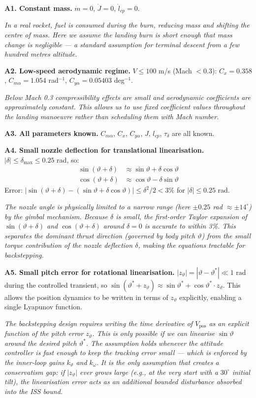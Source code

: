 \documentclass[11pt,a4paper]{article}
\theoremstyle{plain}
\theoremstyle{remark}
\newcommand{\vth}{\vartheta}
\newcommand{\vths}{\vartheta^*}
\newcommand{\zth}{z_{\vth}}
\newcommand{\dmax}{\delta_{\max}}
\begin{document}
\textbf{A1. Constant mass.} $\dot m = 0$, $\dot J = 0$, $\dot l_{cp} = 0$.

\textit{In a real rocket, fuel is consumed during the burn, reducing mass and shifting the centre of mass. Here we assume the landing burn is short enough that mass change is negligible --- a standard assumption for terminal descent from a few hundred metres altitude.}

\textbf{A2. Low-speed aerodynamic regime.} $V \leq 100$ m/s (Mach $< 0.3$): $C_x = 0.358$, $C_{m\alpha} = 1.054$ rad$^{-1}$, $C_{y\alpha} = 0.05403$ deg$^{-1}$.

\textit{Below Mach 0.3 compressibility effects are small and aerodynamic coefficients are approximately constant. This allows us to use fixed coefficient values throughout the landing manoeuvre rather than scheduling them with Mach number.}

\textbf{A3. All parameters known.} $C_{m\alpha}$, $C_x$, $C_{y\alpha}$, $J$, $l_{cp}$, $\tau_\delta$ are all known.

\textbf{A4. Small nozzle deflection for translational linearisation.} $|\delta| \leq \dmax \leq 0.25$ rad, so:
\begin{align}
  \sin(\vth + \delta) &\approx \sin\vth + \delta\cos\vth \\
  \cos(\vth + \delta) &\approx \cos\vth - \delta\sin\vth
\end{align}
Error: $|\sin(\vth+\delta) - (\sin\vth + \delta\cos\vth)| \leq \delta^2/2 < 3\%$ for $|\delta| \leq 0.25$ rad.

\textit{The nozzle angle is physically limited to a narrow range (here $\pm 0.25$ rad $\approx \pm 14^{\circ}$) by the gimbal mechanism. Because $\delta$ is small, the first-order Taylor expansion of $\sin(\vth+\delta)$ and $\cos(\vth+\delta)$ around $\delta=0$ is accurate to within 3\%. This separates the dominant thrust direction (governed by body pitch $\vth$) from the small torque contribution of the nozzle deflection $\delta$, making the equations tractable for backstepping.}

\textbf{A5. Small pitch error for rotational linearisation.} $|\zth| = |\vth - \vths| \ll 1$ rad during the controlled transient, so $\sin(\vths + \zth) \approx \sin\vths + \cos\vths\cdot \zth$. This allows the position dynamics to be written in terms of $\zth$ explicitly, enabling a single Lyapunov function.

\textit{The backstepping design requires writing the time derivative of $V_\mathrm{pos}$ as an explicit function of the pitch error $\zth$. This is only possible if we can linearise $\sin\vth$ around the desired pitch $\vths$. The assumption holds whenever the attitude controller is fast enough to keep the tracking error small --- which is enforced by the inner-loop gains $k_\vth$ and $k_\omega$. It is the only assumption that creates a conservatism gap: if $|\zth|$ ever grows large (e.g., at the very start with a $30^{\circ}$ initial tilt), the linearisation error acts as an additional bounded disturbance absorbed into the ISS bound.}
\end{document}
